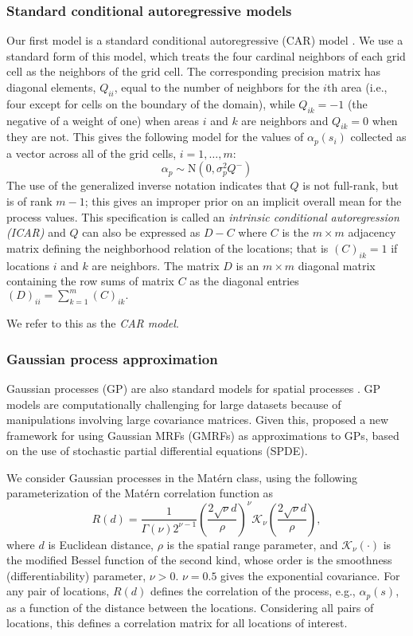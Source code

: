 \documentclass[12pt]{article}\usepackage[]{graphicx}\usepackage[]{color}
\newcommand{\matern}{Mat\'{e}rn }
\begin{document}
\subsubsection{Standard conditional autoregressive models}

Our first model is a standard conditional autoregressive (CAR) model
\citep{Bane:etal:2003}. We use a standard form of this model, which
treats the four cardinal neighbors of each grid cell as the neighbors
of the grid cell. The corresponding precision matrix has diagonal
elements, $Q_{ii}$, equal to the number of neighbors for the $i$th
area (i.e., four except for cells on the boundary of the domain),
while $Q_{ik}=-1$ (the negative of a weight of one) when areas $i$
and $k$ are neighbors and $Q_{ik}=0$ when they are not. This gives
the following model for the values of $\alpha_{p}(s_{i})$ collected
as a vector across all of the grid cells, $i=1,\ldots,m$: 
\[
\alpha_{p}\sim\mbox{N}(0,\sigma_{p}^{2}Q^{-})
\]
The use of the generalized inverse notation indicates that $Q$ is
not full-rank, but is of rank $m-1$; this gives an improper prior
on an implicit overall mean for the process values. This specification
is called an \textit{intrinsic conditional autoregression (ICAR)}
and $Q$ can also be expressed as $D-C$ where $C$ is the $m\times m$
adjacency matrix defining the neighborhood relation of the locations;
that is $(C)_{ik}=1$ if locations $i$ and $k$ are neighbors. The
matrix $D$ is an $m\times m$ diagonal matrix containing the row
sums of matrix $C$ as the diagonal entries $(D)_{ii}={\displaystyle \sum_{k=1}^{m}(C)_{ik}}.$

We refer to this as the \emph{CAR model}.


\subsubsection{Gaussian process approximation}

Gaussian processes (GP) are also standard models for spatial processes \citep{Bane:etal:2003}.
GP models are computationally challenging for large datasets because
of manipulations involving large covariance matrices. Given this,
\cite{Lind:etal:2011} proposed a new framework for using Gaussian
MRFs (GMRFs) as approximations to GPs, based on the use of stochastic
partial differential equations (SPDE).

We consider Gaussian processes in the \matern class, using the following
parameterization of the \matern correlation function as 
\begin{equation}
R(d)=\frac{1}{\Gamma(\nu)2^{\nu-1}}\left(\frac{2\sqrt{\nu}d}{\rho}\right)^{\nu}\mathcal{K}_{\nu}\left(\frac{2\sqrt{\nu}d}{\rho}\right),\label{eq:Matern}
\end{equation}
where $d$ is Euclidean distance, $\rho$ is the spatial range parameter,
and $\mathcal{K}_{\nu}(\cdot)$ is the modified Bessel function of
the second kind, whose order is the smoothness (differentiability)
parameter, $\nu>0$. $\nu=0.5$ gives the exponential covariance.
For any pair of locations, $R(d)$ defines the correlation of the
process, e.g., $\alpha_{p}(s)$, as a function of the distance between
the locations. Considering all pairs of locations, this defines a
correlation matrix for all locations of interest. 
\end{document}
